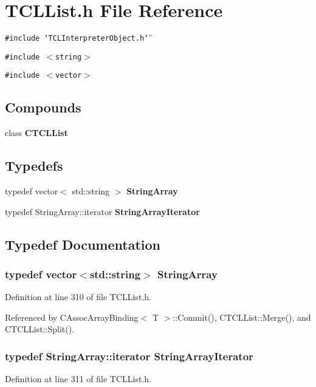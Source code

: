 \section{TCLList.h File Reference}
\label{TCLList_8h}
{\tt \#include \char`\"{}TCLInterpreter\-Object.h\char`\"{}}\par
{\tt \#include $<$string$>$}\par
{\tt \#include $<$vector$>$}\par
\subsection*{Compounds}
\begin{CompactItemize}
\item 
class {\bf CTCLList}
\end{CompactItemize}
\subsection*{Typedefs}
\begin{CompactItemize}
\item 
typedef vector$<$ std::string $>$ {\bf String\-Array}
\item 
typedef String\-Array::iterator {\bf String\-Array\-Iterator}
\end{CompactItemize}


\subsection{Typedef Documentation}
\subsubsection{\setlength{\rightskip}{0pt plus 5cm}typedef vector$<$std::string$>$ String\-Array}\label{TCLList_8h_a0}




Definition at line 310 of file TCLList.h.

Referenced by CAssoc\-Array\-Binding$<$ T $>$::Commit(), CTCLList::Merge(), and CTCLList::Split().
\subsubsection{\setlength{\rightskip}{0pt plus 5cm}typedef String\-Array::iterator String\-Array\-Iterator}\label{TCLList_8h_a1}




Definition at line 311 of file TCLList.h.